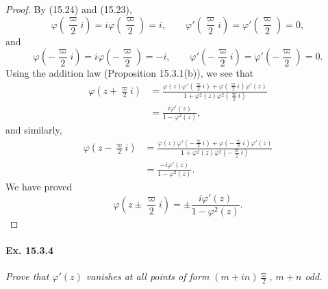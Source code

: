 \documentclass[11pt,a4paper]{article}
\begin{document}
\begin{proof} 
By (15.24) and (15.23), 
$$\varphi\left(\frac{\varpi}{2}i\right) = i \varphi\left(\frac{\varpi}{2}\right) = i, \qquad \varphi'\left(\frac{\varpi}{2}i\right) = \varphi'\left(\frac{\varpi}{2}\right) = 0,$$
and
$$\varphi\left(-\frac{\varpi}{2}i\right) = i\varphi\left(-\frac{\varpi}{2}\right) = -i,\qquad  \varphi'\left(-\frac{\varpi}{2}i\right) = \varphi'\left(-\frac{\varpi}{2}\right) = 0.$$
Using the addition law (Proposition 15.3.1(b)), we see that
\begin{align*}
\varphi\left( z + \frac{\varpi}{2}i \right) &= 
\frac{\varphi(z) \varphi'\left( \frac{\varpi}{2}i\right) + \varphi\left(\frac{\varpi}{2}i\right) \varphi'(z)}{1 + \varphi^2(z) \varphi^2\left(\frac{\varpi}{2}i\right)}\\
&= \frac{i \varphi'(z)}{1 - \varphi^2(z)},
\end{align*}
and similarly, 
\begin{align*}
\varphi\left( z -\frac{\varpi}{2}i \right) &= 
\frac{\varphi(z) \varphi'\left( -\frac{\varpi}{2}i\right) + \varphi\left(-\frac{\varpi}{2}i\right) \varphi'(z)}{1 + \varphi^2(z) \varphi^2\left(-\frac{\varpi}{2}i\right)}\\
&= \frac{-i \varphi'(z)}{1 - \varphi^2(z)}.
\end{align*}
We have proved
$$\varphi\left( z \pm \frac{\varpi}{2}i \right) = \pm  \frac{i \varphi'(z)}{1 - \varphi^2(z)}.$$
\end{proof}

\paragraph{Ex. 15.3.4}{\it Prove that $\varphi'(z)$ vanishes at all points of form $(m+in)\frac{\varpi}{2}$, $m+n$ odd.
}
\end{document}
